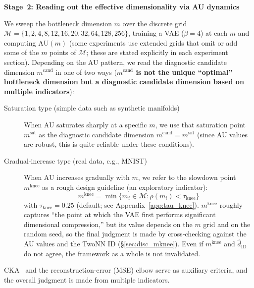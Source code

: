 \documentclass[make,article,submit,pdftex,moreauthors]{Definitions/mdpi}
\newcommand{\dzopt}{m^{\mathrm{cand}}}
\newcommand{\dzsat}{m^{\mathrm{sat}}}
\newcommand{\mknee}{m^{\mathrm{knee}}}
\begin{document}
\textbf{Stage~2: Reading out the effective dimensionality via AU dynamics}

We sweep the bottleneck dimension $m$ over the discrete grid
$\mathcal{M} = \{1, 2, 4, 8, 12,\allowbreak 16, 20, 32,\allowbreak 64, 128, 256\}$,
training a VAE ($\beta = 4$) at each $m$ and computing $\mathrm{AU}(m)$
(some experiments use extended grids that omit or add some of the $m$ points of
$\mathcal{M}$; these are stated explicitly in each experiment section).
Depending on the AU pattern, we read the diagnostic candidate dimension
$\dzopt$ in one of two ways
(\textbf{$\dzopt$ is not the unique ``optimal'' bottleneck dimension but a
diagnostic candidate dimension based on multiple indicators}):

\begin{description}
  \item[Saturation type (simple data such as synthetic manifolds)]
        When AU saturates sharply at a specific $m$, we use that saturation point
        $\dzsat$ as the diagnostic candidate dimension $\dzopt = \dzsat$
        (since AU values are robust, this is quite reliable under these
        conditions).
  \item[Gradual-increase type (real data, e.g., MNIST)]
        When AU increases gradually with $m$, we refer to the slowdown point
        $\mknee$ as a rough design guideline (an exploratory indicator):
        \begin{equation}
          \mknee = \min\{m_i \in \mathcal{M} : \rho(m_i) < \tau_{\mathrm{knee}}\}
          \label{eq:mknee}
        \end{equation}
        with $\tau_{\mathrm{knee}} = 0.25$ (default; see Appendix~\ref{app:tau_knee}).
        $\mknee$ roughly captures ``the point at which the VAE first performs
        significant dimensional compression,'' but its value depends on the $m$
        grid and on the random seed, so the final judgment is made by
        cross-checking against the AU values and the TwoNN ID
        (§\ref{sec:disc_mknee}).
        Even if $\mknee$ and $\hat{d}_\mathrm{ID}$ do not agree, the framework as a
        whole is not invalidated.
\end{description}

CKA~\cite{kornblith2019cka} and the reconstruction-error (MSE) elbow serve as
auxiliary criteria, and the overall judgment is made from multiple indicators.
\end{document}
